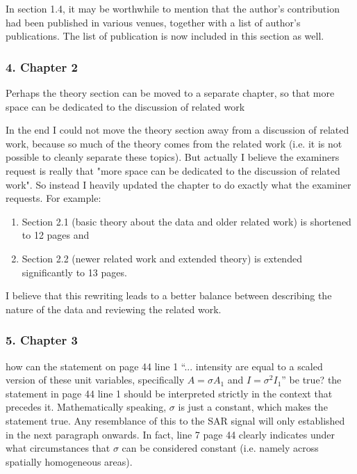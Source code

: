 \replyToComment
    {In section 1.4, it may be worthwhile to mention that the author's contribution had been published in various venues, together with a list of author's publications.}
    {The list of publication is now included in this section as well.}

\subsubsection*{4. Chapter 2}

\replyToComment
    {Perhaps the theory section can be moved to a separate chapter, so that more space can be dedicated to the discussion of related work}
    { In the end I could not move the theory section away from a discussion of related work, because so much of the theory comes from the related work (i.e. it is not possible to cleanly separate these topics). 
    But actually I believe the examiners request is really that "more space can be dedicated to the discussion of related work". So instead I heavily updated the chapter to do exactly what the examiner requests. For example: 
\vspace{-3mm}
\begin{enumerate}
  \item Section 2.1 (basic theory about the data and older related work) is shortened to 12 pages and 
  \item Section 2.2 (newer related work and extended theory) is extended significantly to 13 pages. 
\end{enumerate}
I believe that this rewriting leads to a better balance between describing the nature of the data and reviewing the related work.
}

\subsubsection*{5. Chapter 3}

\replyToComment
    {how can the statement on page 44 line 1 ``... intensity are equal to a scaled version of these unit variables, specifically $A=\sigma A_1$ and $I=\sigma^2 I_1$'' be true?}
    {the statement in page 44 line 1 should be interpreted strictly in the context that precedes it. 
Mathematically speaking, $\sigma$ is just a constant, which makes the statement true.
Any resemblance of this to the SAR signal will only established in the next paragraph onwards.
In fact, line 7 page 44 clearly indicates under what circumstances that $\sigma$ can be considered constant (i.e. namely across spatially homogeneous areas).
}

